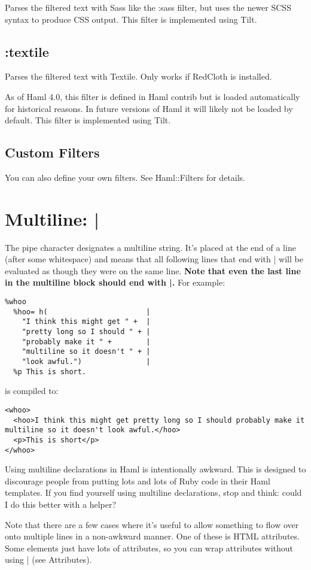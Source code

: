 \documentclass[9pt]{article}
\begin{document}
 Parses the filtered text with Sass like the :sass filter, but uses the newer SCSS syntax to produce CSS output. This filter is implemented using Tilt.
\subsection{:textile}


 Parses the filtered text with Textile. Only works if RedCloth is installed.


 As of Haml 4.0, this filter is defined in Haml contrib but is loaded automatically for historical reasons. In future versions of Haml it will likely not be loaded by default. This filter is implemented using Tilt.
\subsection{Custom Filters}


 You can also define your own filters. See Haml::Filters for details.
\section{Multiline: |}


 The pipe character designates a multiline string. It’s placed at the end of a line (after some whitespace) and means that all following lines that end with | will be evaluated as though they were on the same line. \textbf{Note that even the last line in the multiline block should end with |.}
 For example:
\begin{verbatim}
%whoo
  %hoo= h(                       |
    "I think this might get " +  |
    "pretty long so I should " + |
    "probably make it " +        |
    "multiline so it doesn't " + |
    "look awful.")               |
  %p This is short.
\end{verbatim}


 is compiled to:
\begin{verbatim}
<whoo>
  <hoo>I think this might get pretty long so I should probably make it multiline so it doesn't look awful.</hoo>
  <p>This is short</p>
</whoo>
\end{verbatim}


 Using multiline declarations in Haml is intentionally awkward. This is designed to discourage people from putting lots and lots of Ruby code in their Haml templates. If you find yourself using multiline declarations, stop and think: could I do this better with a helper?


 Note that there are a few cases where it’s useful to allow something to flow over onto multiple lines in a non-awkward manner. One of these is HTML attributes. Some elements just have lots of attributes, so you can wrap attributes without using | (see Attributes).
\end{document}

